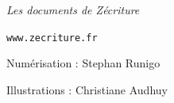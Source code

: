 
\vfill
\vspace{1.7cm}

\hfill {\it Les documents de Zécriture}

\hfill \texttt{www.zecriture.fr}

\vspace{0.7cm}


\hfill Numérisation : Stephan Runigo

\hfill Illustrations : Christiane Audhuy

